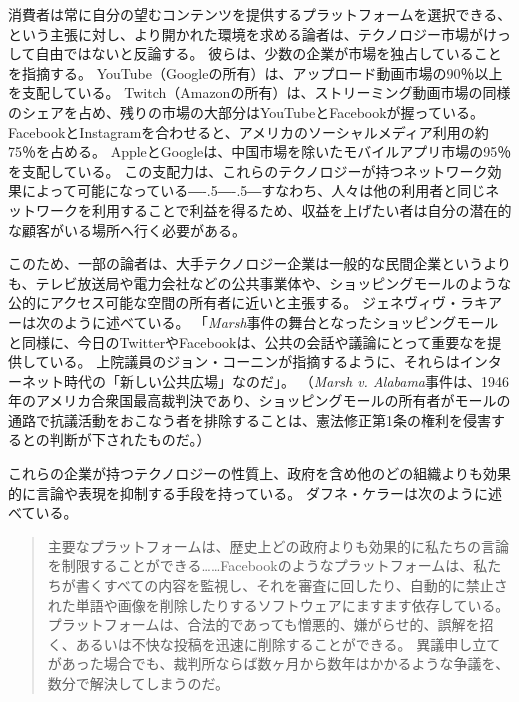 \documentclass[paper=a4,book,openany]{jlreq}
\newcommand{\ig}[1]{}           %
\def\DDASH{―\kern-.5\zw―\kern-.5\zw―} %
\begin{document}
消費者は常に自分の望むコンテンツを提供するプラットフォームを選択できる、という主張に対し、より開かれた環境を求める論者は、テクノロジー市場がけっして自由ではないと反論する。
彼らは、少数の企業が市場を独占していることを指摘する。
YouTube（Googleの所有）は、アップロード動画市場の90％以上を支配している。
Twitch（Amazonの所有）は、ストリーミング動画市場の同様のシェアを占め、残りの市場の大部分はYouTubeとFacebookが握っている。
FacebookとInstagramを合わせると、アメリカのソーシャルメディア利用の約75％を占める\citep{department21:_us_market}。
AppleとGoogleは、中国市場を除いたモバイルアプリ市場の95％を支配している\citep{curry21:_app_store_data}。
この支配力は、これらのテクノロジーが持つネットワーク効果によって可能になっている{\DDASH}すなわち、人々は他の利用者と同じネットワークを利用することで利益を得るため、収益を上げたい者は自分の潜在的な顧客がいる場所へ行く必要がある。

このため、一部の論者は、大手テクノロジー企業は一般的な民間企業というよりも、テレビ放送局や電力会社などの公共事業体や、ショッピングモールのような公的にアクセス可能な空間の所有者に近いと主張する\citep{swire17:_shoul_leadin_onlin_tech_compan}。
ジェネヴィヴ・ラキアー\ig{Genevieve Lakier}は次のように述べている。
「\emph{Marsh}事件の舞台となったショッピングモールと同様に、今日のTwitterやFacebookは、公共の会話や議論にとって重要なを提供している。
上院議員のジョン・コーニン\ig{John Cornyn}が指摘するように、それらはインターネット時代の「新しい公共広場」なのだ」\citep{lakier21:_great_free_speec_rever}。
（\emph{Marsh v. Alabama}事件は、1946年のアメリカ合衆国最高裁判決であり、ショッピングモールの所有者がモールの通路で抗議活動をおこなう者を排除することは、憲法修正第1条の権利を侵害するとの判断が下されたものだ。）

これらの企業が持つテクノロジーの性質上、政府を含め他のどの組織よりも効果的に言論や表現を抑制する手段を持っている。
ダフネ・ケラーは次のように述べている。

\begin{quote}
主要なプラットフォームは、歴史上どの政府よりも効果的に私たちの言論を制限することができる……Facebookのようなプラットフォームは、私たちが書くすべての内容を監視し、それを審査に回したり、自動的に禁止された単語や画像を削除したりするソフトウェアにますます依存している。
プラットフォームは、合法的であっても憎悪的、嫌がらせ的、誤解を招く、あるいは不快な投稿を迅速に削除することができる。
異議申し立てがあった場合でも、裁判所ならば数ヶ月から数年はかかるような争議を、数分で解決してしまうのだ。
\citep{keller19:_faceb_restr_speec_popul_deman}
\end{quote}
\end{document}
